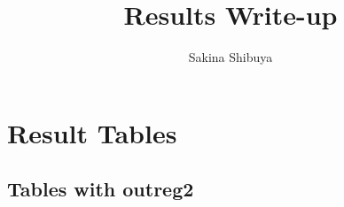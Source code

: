 \documentclass[12pt]{article}
\begin{document}
\title{Results Write-up}
\author{Sakina Shibuya}
\maketitle	

\section{Result Tables}

\subsection{Tables with outreg2}

\begin{table}[H]
	\centering
\end{table}

 
\end{document}

